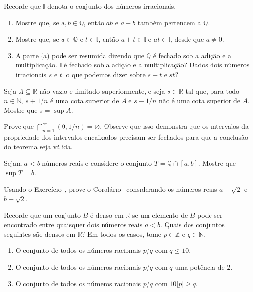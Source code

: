 \begin{exercise}\label{ex:irracionais-racionais}
Recorde que $\mathbb{I}$ denota o conjunto dos números irracionais. 
\begin{enumerate}[label=\alph*)]
\item Mostre que, se $a,b\in\mathbb{Q}$, então $ab$ e $a+b$ também pertencem a $\mathbb{Q}$.
\item Mostre que, se $a\in\mathbb{Q}$ e $t\in\mathbb{I}$, então $a+t\in\mathbb{I}$ e $at\in\mathbb{I}$, desde que $a\neq0$.
\item A parte (a) pode ser resumida dizendo que $\mathbb{Q}$ é fechado sob a adição e a multiplicação. $\mathbb{I}$ é fechado sob a adição e a multiplicação? Dados dois números irracionais $s$ e $t$, o que podemos dizer sobre $s+t$ e $st$?
\end{enumerate}
\end{exercise}

\begin{exercise}\label{ex:supremo-caracterizacao}
Seja $A\subseteq\mathbb{R}$ não vazio e limitado superiormente, e seja $s\in\mathbb{R}$ tal que, para todo $n\in\mathbb{N}$, $s+1/n$ é uma cota superior de $A$ e $s-1/n$ não é uma cota superior de $A$. Mostre que $s=\sup A$.
\end{exercise}

\begin{exercise}\label{ex:intervalos-abertos-vazios}
Prove que $\bigcap_{n=1}^{\infty}(0,1/n)=\varnothing$. Observe que isso demonstra que os intervalos da propriedade dos intervalos encaixados precisam ser fechados para que a conclusão do teorema seja válida.
\end{exercise}

\begin{exercise}\label{ex:supremo-q-intervalo}
Sejam $a<b$ números reais e considere o conjunto $T=\mathbb{Q}\cap[a,b]$. Mostre que $\sup T=b$.
\end{exercise}

\begin{exercise}\label{ex:irracionais-densos}
Usando o Exercício~, prove o Corolário~ considerando os números reais $a-\sqrt{2}$ e $b-\sqrt{2}$.
\end{exercise}

\begin{exercise}\label{ex:conjuntos-densos}
Recorde que um conjunto $B$ é denso em $\mathbb{R}$ se um elemento de $B$ pode ser encontrado entre quaisquer dois números reais $a<b$. Quais dos conjuntos seguintes são densos em $\mathbb{R}$? Em todos os casos, tome $p\in\mathbb{Z}$ e $q\in\mathbb{N}$.
\begin{enumerate}[label=\alph*)]
\item O conjunto de todos os números racionais $p/q$ com $q\leq10$.
\item O conjunto de todos os números racionais $p/q$ com $q$ uma potência de $2$.
\item O conjunto de todos os números racionais $p/q$ com $10|p|\geq q$.
\end{enumerate}
\end{exercise}

